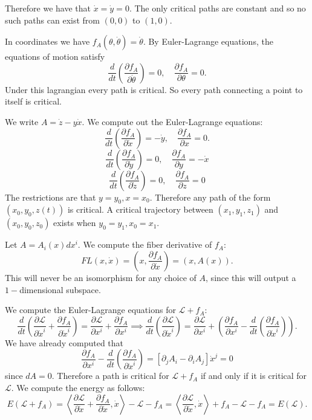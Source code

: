 \documentclass[12pt, a4paper]{article}
\theoremstyle{definition}
\newcommand{\eL}{\mathcal{L}}                         %
\newcommand{\lan}{\left\langle}
\newcommand{\ran}{\right\rangle}
\newcommand{\inn}[1]{\lan#1\ran}
\begin{document}
	Therefore we have that $\dot{x} = \dot{y} = 0$. The only critical paths are constant and so no such paths can exist from $(0,0)$ to $(1,0)$. 
\item In coordinates we have $f_A (\theta, \dot{\theta}) = \dot{\theta}$. By Euler-Lagrange equations, the equations of motion satisfy
	$$ \frac{d}{dt} \left(\frac{\partial f_A}{\partial \dot{\theta}} \right) = 0  , \quad \frac{\partial f_A}{\partial \theta} = 0 .  $$ 
	Under this lagrangian every path is critical.  So every path connecting a point to itself is critical.  
\item We write $A = \dot{z} - y \dot{x}$. We compute out the Euler-Lagrange equations:  
	$$ \frac{d}{dt} \left( \frac{\partial f_A}{\partial \dot{x}}  \right) = -\dot{y}, \quad \frac{\partial f_A}{\partial x}  = 0. $$ 
	$$ \frac{d}{dt} \left( \frac{\partial f_A}{\partial \dot{y}}  \right)  = 0 , \quad \frac{\partial f_A}{\partial y}  = -\dot{x}  $$ 
	$$ \frac{d}{dt} \left( \frac{\partial f_A}{\partial \dot{z}}  \right) = 0 ,  \quad \frac{\partial f_A}{\partial z}    = 0$$ 
	The restrictions are that $y=y_0, x=x_0$. Therefore any path of the form $(x_0, y_0,z(t))$ is critical. A critical trajectory between $ \left(x_1,y_1,z_1 \right) $ and $ \left(x_0, y_0, z_0 \right) $ exists when $y_0 = y_1, x_0 = x_1$.  
\item Let $A = A_i(x) dx^i$. We compute the fiber derivative of $f_A$:
	$$ FL(x,\dot{x}) = \left(x, \frac{\partial f_A}{\partial \dot{x}} \right) = \left(x, A(x) \right) . $$ 
	This will never be an isomorphism for any choice of $A$, since this will output a $1-$dimensional subspace. 
\item We compute the Euler-Lagrange equations for $\eL + f_A$:
	$$ \frac{d}{dt} \left( \frac{\partial \eL}{\partial \dot{x}^i} + \frac{\partial f_A}{\partial\dot{x}^i} \right) = \frac{\partial \eL}{\partial x^i} + \frac{\partial f_A}{\partial x^i}  \implies \frac{d}{dt} \left( \frac{\partial \eL}{\partial \dot{x}^i } \right) = \frac{\partial \eL}{\partial x^i} + \left( \frac{\partial f_A}{\partial x^i} - \frac{d}{dt} \left( \frac{\partial f_A}{\partial \dot{x}^i} \right)\right).$$
	We have already computed that 
	$$  \frac{\partial f_A}{\partial x^i} - \frac{d}{dt} \left( \frac{\partial f_A}{\partial \dot{x}^i} \right) = \left[\partial_j A_i - \partial_i A_j \right]\dot{x}^j = 0 $$
	since $dA =0$.
Therefore a path is critical for $\eL+f_A$ if and only if it is critical for $\eL$. We compute the energy as follows: 
$$ E(\eL + f_A) = \inn{ \frac{\partial \eL}{\partial \dot{x}} + \frac{\partial f_A}{\partial \dot{x}},\dot{x} } - \eL - f_A = \inn{ \frac{\partial \eL}{\partial \dot{x}}, \dot{x}} + f_A - \eL - f_A = E(\eL). $$
\end{document}
